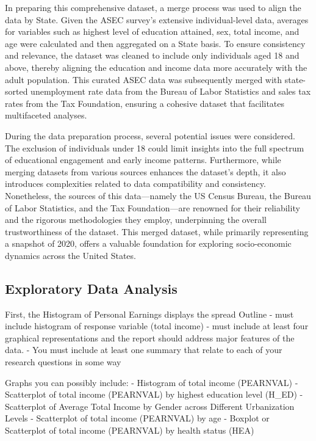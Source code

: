 \documentclass[
  12pt,
]{article}
\begin{document}
In preparing this comprehensive dataset, a merge process was used to
align the data by State. Given the ASEC survey's extensive
individual-level data, averages for variables such as highest level of
education attained, sex, total income, and age were calculated and then
aggregated on a State basis. To ensure consistency and relevance, the
dataset was cleaned to include only individuals aged 18 and above,
thereby aligning the education and income data more accurately with the
adult population. This curated ASEC data was subsequently merged with
state-sorted unemployment rate data from the Bureau of Labor Statistics
and sales tax rates from the Tax Foundation, ensuring a cohesive dataset
that facilitates multifaceted analyses.

During the data preparation process, several potential issues were
considered. The exclusion of individuals under 18 could limit insights
into the full spectrum of educational engagement and early income
patterns. Furthermore, while merging datasets from various sources
enhances the dataset's depth, it also introduces complexities related to
data compatibility and consistency. Nonetheless, the sources of this
data---namely the US Census Bureau, the Bureau of Labor Statistics, and
the Tax Foundation---are renowned for their reliability and the rigorous
methodologies they employ, underpinning the overall trustworthiness of
the dataset. This merged dataset, while primarily representing a
snapshot of 2020, offers a valuable foundation for exploring
socio-economic dynamics across the United States.

\hypertarget{exploratory-data-analysis}{%
\subsection{Exploratory Data Analysis}\label{exploratory-data-analysis}}

First, the Histogram of Personal Earnings displays the spread Outline -
must include histogram of response variable (total income) - must
include at least four graphical representations and the report should
address major features of the data. - You must include at least one
summary that relate to each of your research questions in some way

Graphs you can possibly include: - Histogram of total income (PEARNVAL)
- Scatterplot of total income (PEARNVAL) by highest education level
(H\_ED) - Scatterplot of Average Total Income by Gender across Different
Urbanization Levels - Scatterplot of total income (PEARNVAL) by age -
Boxplot or Scatterplot of total income (PEARNVAL) by health status (HEA)
\end{document}
